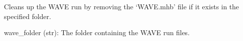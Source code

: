\documentclass[letterpaper,10pt,english]{sphinxmanual}
\begin{document}
\begin{fulllineitems}
\begin{fulllineitems}
\end{fulllineitems}


\begin{fulllineitems}
\label{\detokenize{autoapi/unduwave/index:unduwave.wave_postprocess.cleanup}}
\pysigstartsignatures
{}
\pysigstopsignatures
\sphinxAtStartPar
Cleans up the WAVE run by removing the ‘WAVE.mhb’ file if it exists in the specified folder.
\begin{description}
\sphinxAtStartPar
wave\_folder (str): The folder containing the WAVE run files.

\end{description}

\end{fulllineitems}


\end{fulllineitems}

\end{document}
